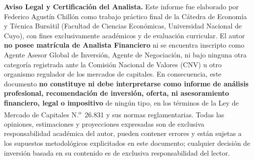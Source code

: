\documentclass[10pt,a4paper]{article}
\begin{document}
\textbf{Aviso Legal y Certificación del Analista.} Este informe fue elaborado por Federico Agustín Chillón como trabajo práctico final de la Cátedra de Economía y Técnica Bursátil (Facultad de Ciencias Económicas, Universidad Nacional de Cuyo), con fines exclusivamente académicos y de evaluación curricular. El autor \textbf{no posee matrícula de Analista Financiero} ni se encuentra inscripto como Agente Asesor Global de Inversión, Agente de Negociación, ni bajo ninguna otra categoría registrada ante la Comisión Nacional de Valores (CNV) u otro organismo regulador de los mercados de capitales. En consecuencia, este documento \textbf{no constituye ni debe interpretarse como informe de análisis profesional, recomendación de inversión, oferta, ni asesoramiento financiero, legal o impositivo} de ningún tipo, en los términos de la Ley de Mercado de Capitales N.\textsuperscript{o}~26.831 y sus normas reglamentarias. Todas las opiniones, estimaciones y proyecciones expresadas son de exclusiva responsabilidad académica del autor, pueden contener errores y están sujetas a los supuestos metodológicos explicitados en este documento; cualquier decisión de inversión basada en su contenido es de exclusiva responsabilidad del lector.
\end{document}
